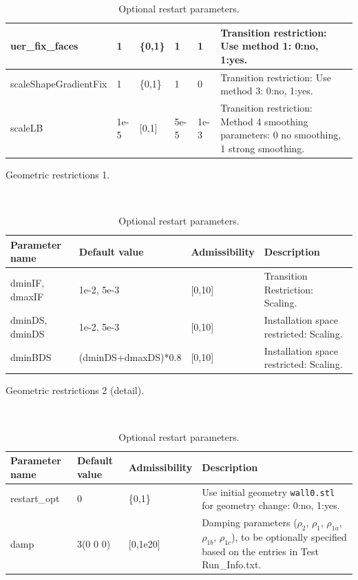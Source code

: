 \documentclass[oneside]{article}
\numberwithin{equation}{section}
\numberwithin{figure}{section}
\numberwithin{figure}{section}
\begin{document}
\begin{table}[h]
\begin{tabular}{|l|p{1cm}|p{1.2cm}|p{0.7cm}|p{0.7cm}|p{5.7cm}|}
        \hline
        uer\_fix\_faces                &  1     &  \{0,1\}    & 1     & 1 & Transition restriction: Use method 1: 0:no, 1:yes.\\
        \hline
        scaleShapeGradientFix          &  1     &  \{0,1\}    & 1     & 0 & Transition restriction: Use method 3: 0:no, 1:yes.\\
        \hline
        scaleLB                        &  1e-5  &  [0,1]      & 5e-5  & 1e-3 & Transition restriction: Method 4 smoothing parameters: 0 no smoothing, 1 strong smoothing.\\
        \hline
    \end{tabular}
    \caption{Geometric restrictions 1.}\label{tab:parameter8}
    $ $\\
    \begin{tabular}{|p{2.5cm}|p{3.7cm}|p{1cm}|l|} %
        \hline
        \cellcolor{light-gray} Parameter name & \cellcolor{light-gray} Default value & \cellcolor{light-gray} Admissibility  & \cellcolor{light-gray} Description \\
        \hline
        dminIF, dmaxIF   &  1e-2, 5e-3  &  [0,10]       & Transition Restriction: Scaling.\\
        \hline
        dminDS, dminDS   &  1e-2, 5e-3  &  [0,10]      & Installation space restricted: Scaling.\\
        \hline
        dminBDS          &  (dminDS+dmaxDS)*0.8  &  [0,10]      & Installation space restricted: Scaling. \\
        \hline
    \end{tabular}
    \caption{Geometric restrictions 2 (detail).}\label{tab:parameter8}
    $ $\\
    \begin{tabular}{|p{1.6cm}|p{1.2cm}|p{1cm}|p{7.6cm}|} %
        \hline
        \cellcolor{light-gray} Parameter name & \cellcolor{light-gray} Default value & \cellcolor{light-gray} Admissibility  & \cellcolor{light-gray} Description \\
        \hline
        restart\_opt      &  0  &  \{0,1\}       & Use initial geometry \texttt{wall0.stl} for geometry change: 0:no, 1:yes. \\
        \hline
        damp           &  3(0 0 0)  &  [0,1e20]      & Damping parameters ($\rho_2$, $\rho_1$, $\rho_{1a}$, $\rho_{1b}$, $\rho_{1c}$), to be optionally specified based on the entries in Test Run\_Info.txt.\\
        \hline
    \end{tabular}
    \caption{Optional restart parameters.}\label{tab:parameter9}
\end{table}
%
\newpage 
$ $\\
\newpage
\end{document}
